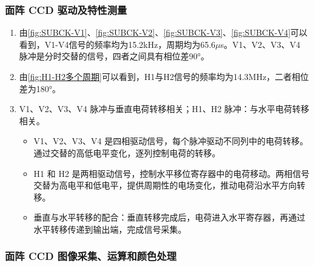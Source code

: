 \documentclass[dvipsnames, svgnames,a4paper,11pt]{article}
\begin{document}
	\subsubsection{面阵 CCD 驱动及特性测量}

		\begin{enumerate}
			\item 由\cref{fig:SUBCK-V1}、\cref{fig:SUBCK-V2}、\cref{fig:SUBCK-V3}、\cref{fig:SUBCK-V4}可以看到，V1-V4信号的频率均为15.2kHz，周期均为65.6$\mu $s。V1、V2、V3、V4 脉冲是分时交替的信号，四者之间具有相位差90°。
			\item 由\cref{fig:H1-H2多个周期}可以看到，H1与H2信号的频率均为14.3MHz，二者相位差为180°。
			\item V1、V2、V3、V4 脉冲与垂直电荷转移相关；H1、H2 脉冲：与水平电荷转移相关。
				\begin{itemize}
					\item V1、V2、V3、V4 是四相驱动信号，每个脉冲驱动不同列中的电荷转移。通过交替的高低电平变化，逐列控制电荷的转移。
					\item H1 和 H2 是两相驱动信号，控制水平移位寄存器中的电荷移动。两相信号交替为高电平和低电平，提供周期性的电场变化，推动电荷沿水平方向转移。		
					\item 垂直与水平转移的配合：垂直转移完成后，电荷进入水平寄存器，再通过水平转移传递到输出端，完成信号采集。			
				\end{itemize}
		\end{enumerate}


















	\subsubsection{面阵 CCD 图像采集、运算和颜色处理}
\end{document}
